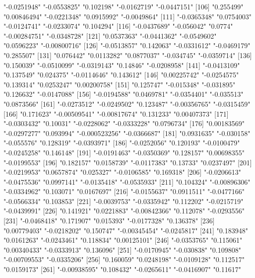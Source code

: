 \begin{Schunk}
\begin{Soutput}
[101] "-0.0251948"   "-0.0553825"   "0.102198"     "-0.0162719"   "-0.0447151"  
[106] "0.255499"     "0.00846494"   "-0.0221348"   "0.0915992"    "-0.0049864"  
[111] "-0.0365348"   "0.0754003"    "-0.0124741"   "-0.0233074"   "0.104294"    
[116] "-0.0437689"   "-0.056042"    "0.0774"       "-0.00284751"  "-0.0348728"  
[121] "0.0537363"    "-0.0441362"   "-0.0549602"   "0.0596223"    "-0.00800716" 
[126] "-0.0513857"   "0.142063"     "-0.0331612"   "-0.0469179"   "0.285507"    
[131] "0.076442"     "0.0113282"    "0.0877037"    "-0.034745"    "-0.0359714"  
[136] "0.150039"     "-0.0510099"   "-0.0319143"   "0.14846"      "-0.0208958"  
[141] "-0.0413109"   "0.137549"     "0.024375"     "-0.0114646"   "0.143612"    
[146] "0.00225742"   "-0.0254575"   "0.139314"     "0.0253247"    "0.00200758"  
[151] "0.125747"     "-0.015348"    "-0.031895"    "0.126632"     "-0.0147088"  
[156] "-0.0194588"   "0.0469781"    "-0.0354401"   "-0.035513"    "0.0873566"   
[161] "-0.0273512"   "-0.0249502"   "0.123487"     "-0.00356765"  "-0.0315459"  
[166] "0.171623"     "-0.00509541"  "-0.00817674"  "0.131233"     "0.00407373"  
[171] "-0.0303432"   "0.10031"      "-0.0228062"   "-0.0333228"   "0.0796734"   
[176] "0.00183569"   "-0.0297277"   "0.093994"     "-0.000523256" "-0.0366687"  
[181] "0.0931635"    "-0.030158"    "-0.055576"    "0.128319"     "-0.0393971"  
[186] "-0.0252056"   "0.120193"     "-0.0100479"   "-0.0245258"   "0.146148"    
[191] "-0.0191463"   "-0.0350369"   "0.128157"     "0.00698355"   "-0.0199553"  
[196] "0.182157"     "0.0158739"    "-0.0117383"   "0.13733"      "0.0237497"   
[201] "-0.0219953"   "0.0657874"    "0.025327"     "-0.0106585"   "0.169318"    
[206] "-0.0206613"   "-0.0475536"   "0.0997141"    "-0.0135418"   "-0.0535933"  
[211] "0.104324"     "-0.00896306"  "-0.0334962"   "0.103071"     "0.0167697"   
[216] "-0.0155637"   "0.0911511"    "-0.0477166"   "-0.0566334"   "0.103853"    
[221] "-0.0039753"   "-0.0335942"   "0.112202"     "-0.0215719"   "-0.0439991"  
[226] "0.141921"     "0.0221883"    "-0.00842366"  "0.112078"     "-0.0293556"  
[231] "-0.0468418"   "0.171907"     "0.015393"     "-0.0177328"   "0.136378"    
[236] "0.00779403"   "-0.0218202"   "0.150747"     "-0.00345454"  "-0.0245817"  
[241] "0.183948"     "0.0161263"    "-0.0243461"   "0.118834"     "0.00125101"  
[246] "-0.0353765"   "0.115061"     "0.00340433"   "-0.0333913"   "0.136096"    
[251] "-0.0170945"   "-0.030838"    "0.109808"     "-0.00709553"  "-0.0335206"  
[256] "0.160059"     "0.0248198"    "-0.0109128"   "0.112517"     "0.0159173"   
[261] "-0.00938595"  "0.108432"     "-0.0265611"   "-0.0416907"   "0.11617"     

\end{Soutput}
\end{Schunk}
